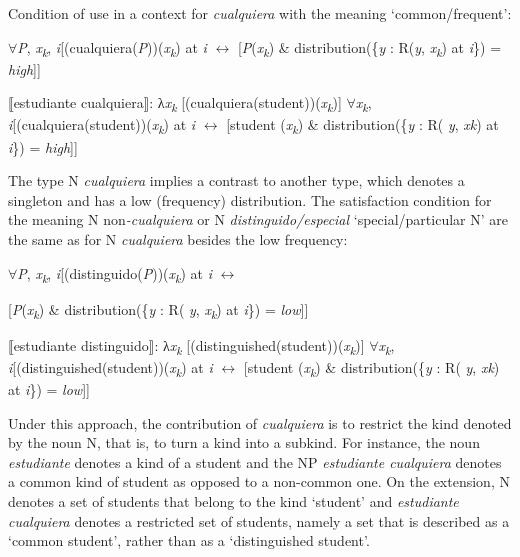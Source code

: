 {\ea \label{bkm:Ref54641377} %
Condition of use in a context for \textit{cualquiera} with the meaning ‘common/frequent’:

    ${\forall}$\textit{P}, \textit{x\textsubscript{k}}, \textit{i}[(cualquiera(\textit{P}))(\textit{x\textsubscript{k}}) at \textit{i} $\leftrightarrow $ [\textit{P}(\textit{x\textsubscript{k}}) \& distribution(\{\textit{y} : R(\textit{y}, \textit{x\textsubscript{k}}) at \textit{i}\}) = \textit{high}]]
\z 

\ea \label{ex:key:158} %
\ea ⟦estudiante cualquiera⟧: λ\textit{x\textsubscript{k}} [(cualquiera({student}))(\textit{x\textsubscript{k}})]
\ex ${\forall}$\textit{x\textsubscript{k}}, \textit{i}[(cualquiera(student))(\textit{x\textsubscript{k}}) at \textit{i} $\leftrightarrow $ [student (\textit{x\textsubscript{k}}) \& distribution(\{\textit{y} : R( \textit{y}, \textit{xk}) at \textit{i}\}) = \textit{high}]]
\z
\z 

The type N \textit{cualquiera} implies a contrast to another type, which denotes a singleton and has a low (frequency) distribution. The satisfaction condition for the meaning N non\textit{{}-cualquiera} or N \textit{distinguido/especial} ‘special/particular N’ are the same as for N \textit{cualquiera} besides the low frequency:

\ea \label{ex:key:159} %
    ${\forall}$\textit{P}, \textit{x\textsubscript{k}}, \textit{i}[(distinguido(\textit{P}))(\textit{x\textsubscript{k}}) at \textit{i} $\leftrightarrow $

    [\textit{P}(\textit{x\textsubscript{k}}) \& distribution(\{\textit{y} : R( \textit{y}, \textit{x\textsubscript{k}}) at \textit{i}\}) = \textit{low}]]
\z 

\ea \label{ex:key:160} %
\ea ⟦estudiante distinguido⟧: λ\textit{x\textsubscript{k}} [(distinguished({student}))(\textit{x\textsubscript{k}})]
\ex ${\forall}$\textit{x\textsubscript{k}}, \textit{i}[(distinguished(student))(\textit{x\textsubscript{k}}) at \textit{i} $\leftrightarrow $ [student (\textit{x\textsubscript{k}}) \& distribution(\{\textit{y} : R( \textit{y}, \textit{xk}) at \textit{i}\}) = \textit{low}]]
\z
\z

Under this approach, the contribution of \textit{cualquiera} is to restrict the kind denoted by the noun N, that is, to turn a kind into a subkind. For instance, the noun \textit{estudiante} denotes a kind of a student and the NP \textit{estudiante cualquiera} denotes a common kind of student as opposed to a non-common one. On the extension, N denotes a set of students that belong to the kind ‘student’ and \textit{estudiante cualquiera} denotes a restricted set of students, namely a set that is described as a ‘common student’, rather than as a ‘distinguished student’.

}
